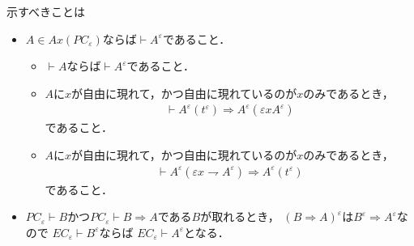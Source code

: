 	示すべきことは
	\begin{itemize}
		\item $A \in Ax(PC_{\varepsilon})$ならば$\vdash A^{\varepsilon}$であること．
			\begin{itemize}
				\item $\vdash A$ならば$\vdash A^{\varepsilon}$であること．
				\item $A$に$x$が自由に現れて，かつ自由に現れているのが$x$のみであるとき，
					\begin{align}
						\vdash A^{\varepsilon}(t^{\varepsilon}) \Longrightarrow A^{\varepsilon}(\varepsilon x A^{\varepsilon})
					\end{align}
					であること．
				\item $A$に$x$が自由に現れて，かつ自由に現れているのが$x$のみであるとき，
					\begin{align}
						\vdash A^{\varepsilon}(\varepsilon x \rightharpoondown A^{\varepsilon}) \Longrightarrow A^{\varepsilon}(t^{\varepsilon})
					\end{align}
					であること．
			\end{itemize}
		
		\item $PC_{\varepsilon} \vdash B$かつ$PC_{\varepsilon} \vdash B \Longrightarrow A$である$B$が取れるとき，
			$(B \Longrightarrow A)^{\varepsilon}$は$B^{\varepsilon} \Longrightarrow A^{\varepsilon}$なので
			$EC_{\varepsilon} \vdash B^{\varepsilon}$ならば
			$EC_{\varepsilon} \vdash A^{\varepsilon}$となる．
	\end{itemize}
	
	\begin{screen}
		\begin{thm}[置換補題]
		\end{thm}
	\end{screen}
	
